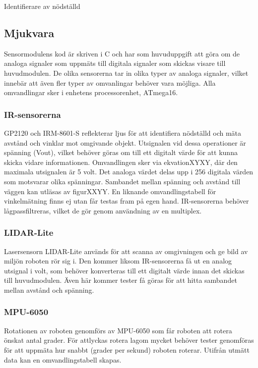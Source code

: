 \documentclass[11pt]{article}
\begin{document}
\begin{flushleft}
\item[Identifierare av nödställd] \hfill \\


\subsection{Mjukvara}
Sensormodulens kod är skriven i C och har som huvuduppgift att göra om de analoga signaler som uppmäts till digitala signaler som skickas visare till huvudmodulen. De olika sensorerna tar in olika typer av analoga signaler, vilket innebär att även fler typer av omvanlingar behöver vara möjliga. Alla omvandlingar sker i enhetens processorenhet, ATmega16. 

\subsubsection{IR-sensorerna}
GP2120 och IRM-8601-S reflekterar ljus för att identifiera nödställd och mäta avstånd och vinklar mot omgivande objekt. Utsignalen vid dessa operationer är spänning (Vout), vilket behöver göras om till ett digitalt värde för att kunna skicka vidare informationen. Omvandlingen sker via ekvationXYXY, där den maximala utsignalen är 5 volt. Det analoga värdet delas upp i 256 digitala värden som motsvarar olika spänningar. Sambandet mellan spänning och avstånd till väggen kan utläsas av figurXXYY. En liknande omvandlingstabell för vinkelmätning finns ej utan får testas fram på egen hand. IR-sensorerna behöver lågpassfiltreras, vilket de gör genom användning av en multiplex.

\subsubsection{LIDAR-Lite}
Lasersensorn LIDAR-Lite används för att scanna av omgivningen och ge bild av miljön roboten rör sig i. Den kommer liksom IR-sensorerna få ut en analog utsignal i volt, som behöver konverteras till ett digitalt värde innan det skickas till huvudmodulen. Även här kommer tester få göras för att hitta sambandet mellan avstånd och spänning.

\subsubsection{MPU-6050}
Rotationen av roboten genomförs av MPU-6050 som får roboten att rotera önskat antal grader. För attlyckas rotera lagom mycket behöver tester genomföras för att uppmäta hur snabbt (grader per sekund) roboten roterar. Utifrån utmätt data kan en omvandlingstabell skapas.


\end{flushleft}
\end{document}
